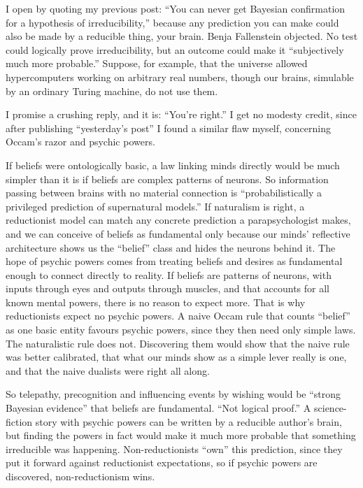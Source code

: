 
I open by quoting my previous post: ``You can never get Bayesian confirmation for a hypothesis of irreducibility,'' because any prediction you can make could also be made by a reducible thing, your brain. Benja Fallenstein objected. No test could logically prove irreducibility, but an outcome could make it ``subjectively much more probable.'' Suppose, for example, that the universe allowed hypercomputers working on arbitrary real numbers, though our brains, simulable by an ordinary Turing machine, do not use them.

I promise a crushing reply, and it is: ``You're right.'' I get no modesty credit, since after publishing ``yesterday's post'' I found a similar flaw myself, concerning Occam's razor and psychic powers. 

If beliefs were ontologically basic, a law linking minds directly would be much simpler than it is if beliefs are complex patterns of neurons. So information passing between brains with no material connection is ``probabilistically a privileged prediction of supernatural models.'' If naturalism is right, a reductionist model can match any concrete prediction a parapsychologist makes, and we can conceive of beliefs as fundamental only because our minds' reflective architecture shows us the ``belief'' class and hides the neurons behind it. The hope of psychic powers comes from treating beliefs and desires as fundamental enough to connect directly to reality. If beliefs are patterns of neurons, with inputs through eyes and outputs through muscles, and that accounts for all known mental powers, there is no reason to expect more. That is why reductionists expect no psychic powers. A naive Occam rule that counts ``belief'' as one basic entity favours psychic powers, since they then need only simple laws. The naturalistic rule does not. Discovering them would show that the naive rule was better calibrated, that what our minds show as a simple lever really is one, and that the naive dualists were right all along.

So telepathy, precognition and influencing events by wishing would be ``strong Bayesian evidence'' that beliefs are fundamental. ``Not logical proof.'' A science-fiction story with psychic powers can be written by a reducible author's brain, but finding the powers in fact would make it much more probable that something irreducible was happening. Non-reductionists ``own'' this prediction, since they put it forward against reductionist expectations, so if psychic powers are discovered, non-reductionism wins. 

